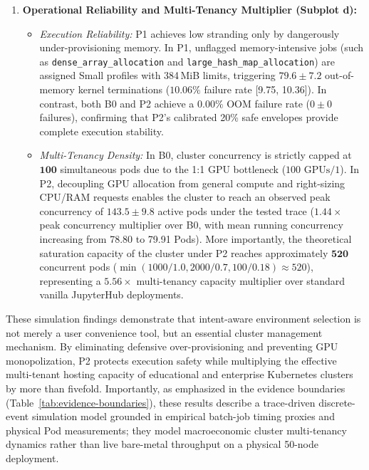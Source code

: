 \begin{enumerate}
    \item \textbf{Operational Reliability and Multi-Tenancy Multiplier (Subplot d):}
    \begin{itemize}
        \item \textit{Execution Reliability:} P1 achieves low stranding only by dangerously under-provisioning memory. In P1, unflagged memory-intensive jobs (such as \texttt{dense\_array\_allocation} and \texttt{large\_hash\_map\_allocation}) are assigned Small profiles with 384\,MiB limits, triggering $\mathbf{79.6 \pm 7.2}$ out-of-memory kernel terminations ($\mathbf{10.06\%}$ failure rate [9.75, 10.36]). In contrast, both B0 and P2 achieve a $\mathbf{0.00\%}$ OOM failure rate ($0 \pm 0$ failures), confirming that P2's calibrated 20\% safe envelopes provide complete execution stability.
        \item \textit{Multi-Tenancy Density:} In B0, cluster concurrency is strictly capped at $\mathbf{100}$ simultaneous pods due to the 1:1 GPU bottleneck ($100 \text{ GPUs} / 1$). In P2, decoupling GPU allocation from general compute and right-sizing CPU/RAM requests enables the cluster to reach an observed peak concurrency of $\mathbf{143.5 \pm 9.8}$ active pods under the tested trace ($\mathbf{1.44\times}$ peak concurrency multiplier over B0, with mean running concurrency increasing from 78.80 to 79.91 Pods). More importantly, the theoretical saturation capacity of the cluster under P2 reaches approximately $\mathbf{520}$ concurrent pods ($\min(1000/1.0, 2000/0.7, 100/0.18) \approx 520$), representing a $\mathbf{5.56\times}$ multi-tenancy capacity multiplier over standard vanilla JupyterHub deployments.
    \end{itemize}
\end{enumerate}

These simulation findings demonstrate that intent-aware environment selection is not merely a user convenience tool, but an essential cluster management mechanism. By eliminating defensive over-provisioning and preventing GPU monopolization, P2 protects execution safety while multiplying the effective multi-tenant hosting capacity of educational and enterprise Kubernetes clusters by more than fivefold. Importantly, as emphasized in the evidence boundaries (Table~\ref{tab:evidence-boundaries}), these results describe a trace-driven discrete-event simulation model grounded in empirical batch-job timing proxies and physical Pod measurements; they model macroeconomic cluster multi-tenancy dynamics rather than live bare-metal throughput on a physical 50-node deployment.
